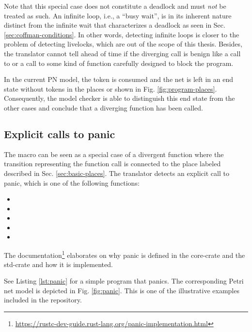 Note that this special case does not constitute a deadlock and must \emph{not} be treated as such.
An infinite loop, i.e., a ``busy wait'', is in its inherent nature distinct from the infinite wait that
characterizes a deadlock as seen in Sec. \ref{sec:coffman-conditions}.
In other words, detecting infinite loops is closer to the problem of detecting livelocks,
which are out of the scope of this thesis.
Besides, the translator cannot tell ahead of time
if the diverging call is benign like a call to 
or a call to some kind of function carefully designed to block the program.

In the current \acrshort{PN} model, the token is consumed and the net is left
in an end state without tokens in the places
 or  shown in Fig. \ref{fig:program-places}.
Consequently, the model checker is able to distinguish this end state from the other cases
and conclude that a diverging function has been called.

\subsection{Explicit calls to panic}

The  macro can be seen as a special case of a divergent function
where the transition representing the function call is connected to
the place labeled  described in Sec. \ref{sec:basic-places}.
The translator detects an explicit call to panic,
which is one of the following functions:

\begin{itemize}
    \item {}
    \item {}
    \item {}
    \item {}
    \item {}
\end{itemize}

The documentation\footnote{\url{https://rustc-dev-guide.rust-lang.org/panic-implementation.html}}
elaborates on why panic is defined in the core-crate and the std-crate and how it is implemented.

See Listing \ref{lst:panic} for a simple program that panics. The corresponding Petri net model is depicted in Fig. \ref{fig:panic}.
This is one of the illustrative examples included in the repository.

